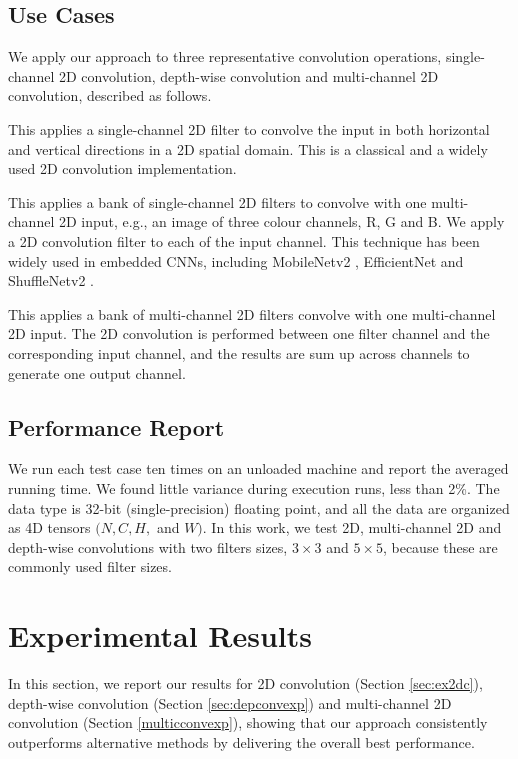 \subsection{Use Cases}
We apply our approach to three representative convolution operations, single-channel 2D convolution, depth-wise convolution and
multi-channel 2D convolution, described as follows.

 This applies a single-channel 2D filter to convolve the input in both horizontal and vertical
directions in a 2D spatial domain. This is a classical and a widely used 2D convolution implementation.

 This applies a bank of single-channel 2D filters to convolve with one multi-channel 2D input, e.g., an
image of three colour channels, R, G and B. We apply a 2D convolution filter to each of the input channel. This technique has been widely
used in embedded CNNs, including MobileNetv2 \cite{Sandler_2018_CVPR}, EfficientNet \cite{tan2019efficientnet} and ShuffleNetv2
\cite{Ma_2018_ECCV}.

 This applies a bank of multi-channel 2D filters convolve with one multi-channel 2D input. The 2D
convolution is performed between one filter channel and the corresponding input channel, and the results are sum up across channels to
generate one output channel.


\subsection{Performance Report}
We run each test case ten times on an unloaded machine and report the averaged running time. We found little variance during
execution runs, less than 2\%.  The data type is 32-bit (single-precision) floating point, and all the data are organized as 4D tensors
$(N,C,H,$ and $W)$. In this work, we test 2D, multi-channel 2D and depth-wise convolutions with two filters sizes, $3 \times 3$ and $5
\times 5$, because these are commonly used filter sizes.
%

\section{Experimental Results}
\label{exp} In this section, we report our results for 2D convolution (Section \ref{sec:ex2dc}), depth-wise convolution (Section
\ref{sec:depconvexp}) and multi-channel 2D convolution (Section \ref {multicconvexp}), showing that our approach consistently outperforms
alternative methods by delivering the overall best performance.


